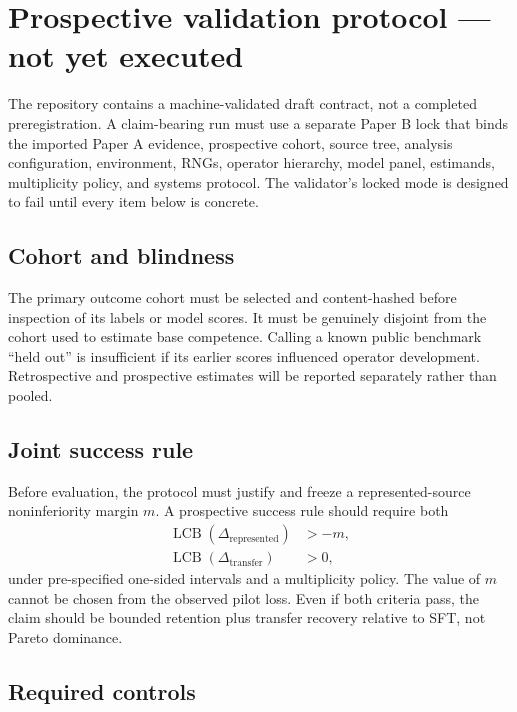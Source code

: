 \documentclass[11pt]{article}
\begin{document}
\section{Prospective validation protocol --- not yet executed}
\label{sec:prospective}

The repository contains a machine-validated draft contract, not a completed preregistration.  A
claim-bearing run must use a separate Paper B lock that binds the imported Paper A evidence,
prospective cohort, source tree, analysis configuration, environment, RNGs, operator hierarchy,
model panel, estimands, multiplicity policy, and systems protocol.  The validator's locked mode is
designed to fail until every item below is concrete.

\subsection{Cohort and blindness}

The primary outcome cohort must be selected and content-hashed before inspection of its labels or
model scores.  It must be genuinely disjoint from the cohort used to estimate base competence.
Calling a known public benchmark ``held out'' is insufficient if its earlier scores influenced
operator development.  Retrospective and prospective estimates will be reported separately rather
than pooled.

\subsection{Joint success rule}

Before evaluation, the protocol must justify and freeze a represented-source noninferiority
margin $m$.  A prospective success rule should require both
\begin{align}
  \operatorname{LCB}(\Delta_{\mathrm{represented}}) &> -m, \\
  \operatorname{LCB}(\Delta_{\mathrm{transfer}}) &> 0,
\end{align}
under pre-specified one-sided intervals and a multiplicity policy.  The value of $m$ cannot be
chosen from the observed pilot loss.  Even if both criteria pass, the claim should be bounded
retention plus transfer recovery relative to SFT, not Pareto dominance.

\subsection{Required controls}
\end{document}
